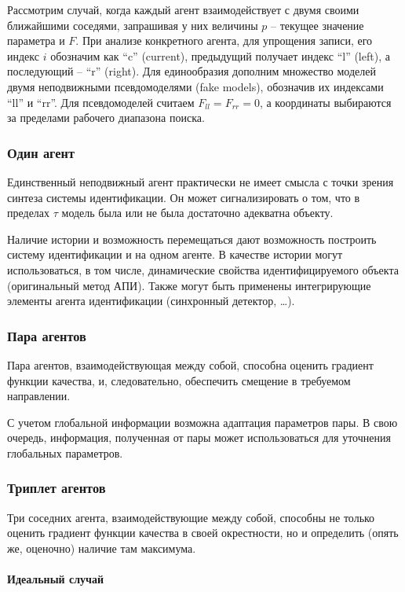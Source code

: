 Рассмотрим случай, когда каждый агент взаимодействует с двумя своими ближайшими соседями,
запрашивая у них величины $p$ -- текущее значение параметра и $F$.
При анализе конкретного агента, для упрощения записи, его индекс $i$ обозначим как ``c'' (current),
предыдущий получает индекс ``l'' (left), а последующий -- ``r'' (right).
Для единообразия дополним множество моделей двумя неподвижными псевдомоделями (fake models),
обозначив их индексами ``ll'' и ``rr''. Для псевдомоделей считаем $  F_{ll} = F_{rr} = 0$,
а координаты выбираются за пределами рабочего диапазона поиска.


\subsubsection{Один агент}

Единственный неподвижный агент практически не имеет смысла
с точки зрения синтеза системы идентификации.
Он может сигнализировать о том, что в пределах
\(\tau\) модель была или не была достаточно адекватна
объекту.

Наличие истории и возможность перемещаться дают возможность
построить систему идентификации и на одном агенте.
В качестве истории могут использоваться, в том числе,
динамические свойства идентифицируемого объекта
(оригинальный метод АПИ). Также могут быть
применены интегрирующие элементы агента идентификации
(синхронный детектор, \ldots).

\subsubsection{Пара агентов}

Пара агентов, взаимодействующая между собой,
способна оценить градиент функции качества,
и, следовательно, обеспечить смещение в требуемом направлении.

С учетом глобальной информации возможна адаптация параметров пары.
В свою очередь, информация, полученная от пары может
использоваться для уточнения глобальных параметров.

\subsubsection{Триплет агентов}

Три соседних агента, взаимодействующие между собой,
способны не только оценить градиент функции качества в своей окрестности,
но и определить (опять же, оценочно) наличие там максимума.

\paragraph{Идеальный случай}

